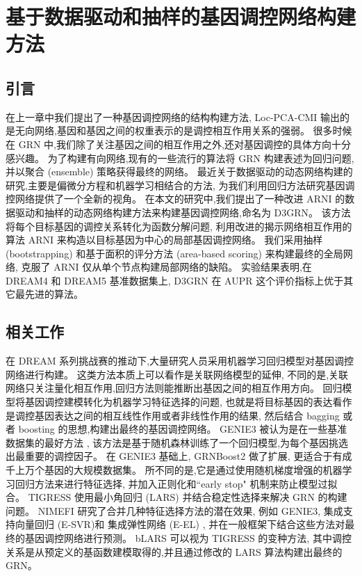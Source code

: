 \section{基于数据驱动和抽样的基因调控网络构建方法}
\label{sec:d3grn}

\subsection{引言}

在上一章中我们提出了一种基因调控网络的结构构建方法,
Loc-PCA-CMI 输出的是无向网络,基因和基因之间的权重表示的是调控相互作用关系的强弱。
很多时候在 GRN 中,我们除了关注基因之间的相互作用之外,还对基因调控的具体方向十分感兴趣。
为了构建有向网络,现有的一些流行的算法将 GRN 构建表述为回归问题,并以聚合 (ensemble) 策略获得最终的网络。
最近关于数据驱动的动态网络构建的研究,主要是偏微分方程和机器学习相结合的方法, 
为我们利用回归方法研究基因调控网络提供了一个全新的视角。
在本文的研究中,我们提出了一种改进 ARNI 的数据驱动和抽样的动态网络构建方法来构建基因调控网络,命名为 D3GRN。
该方法将每个目标基因的调控关系转化为函数分解问题,
利用改进的揭示网络相互作用的算法 ARNI 来构造以目标基因为中心的局部基因调控网络。
我们采用抽样 (bootstrapping) 和基于面积的评分方法 (area-based scoring) 来构建最终的全局网络,
克服了 ARNI 仅从单个节点构建局部网络的缺陷。
实验结果表明,在 DREAM4 和 DREAM5 基准数据集上, D3GRN 在 AUPR 这个评价指标上优于其它最先进的算法。

\subsection{相关工作}

在 DREAM 系列挑战赛的推动下,大量研究人员采用机器学习回归模型对基因调控网络进行构建。
这类方法本质上可以看作是关联网络模型的延伸,
不同的是,关联网络只关注量化相互作用,回归方法则能推断出基因之间的相互作用方向。
回归模型将基因调控建模转化为机器学习特征选择的问题,
也就是将目标基因的表达看作是调控基因表达之间的相互线性作用或者非线性作用的结果,
然后结合 bagging 或者 boosting 的思想,构建出最终的基因调控网络。
GENIE3 \cite{huynh2010inferring} 被认为是在一些基准数据集的最好方法 \cite{marbach2010revealing},
该方法是基于随机森林训练了一个回归模型,为每个基因挑选出最重要的调控因子。
在 GENIE3 基础上, GRNBoost2 \cite{moerman2019grnboost2} 做了扩展, 更适合于有成千上万个基因的大规模数据集。
所不同的是,它是通过使用随机梯度增强的机器学习回归方法来进行特征选择, 
并加入正则化和``early stop" 机制来防止模型过拟合。 
TIGRESS \cite{Haury2012} 使用最小角回归 (LARS) 并结合稳定性选择来解决 GRN 的构建问题。
NIMEFI \cite{ruyssinck2014nimefi} 研究了合并几种特征选择方法的潜在效果,
例如 GENIE3, 集成支持向量回归 (E-SVR)和 集成弹性网络 (E-EL) \cite{zou2005regularization},
并在一般框架下结合这些方法对最终的基因调控网络进行预测。
bLARS \cite{singh2016blars} 可以视为 TIGRESS 的变种方法,
其中调控关系是从预定义的基函数建模取得的,并且通过修改的 LARS 算法构建出最终的 GRN。

